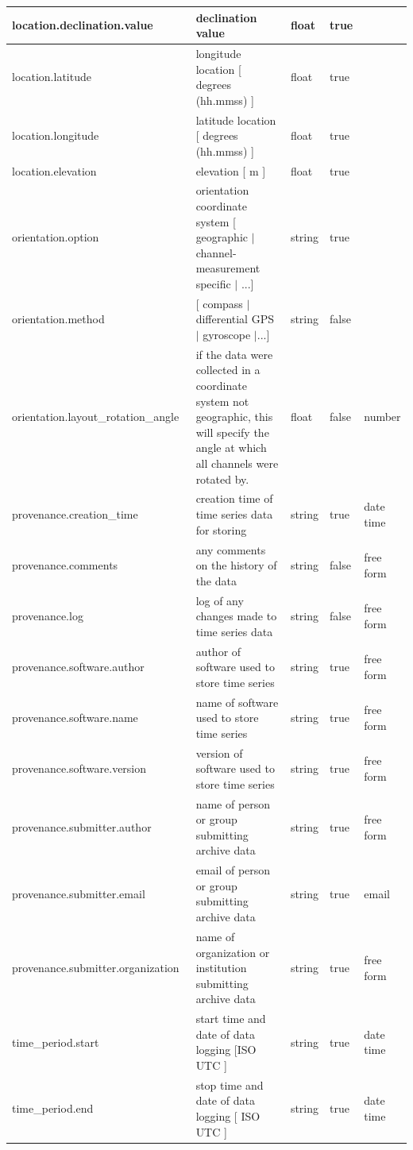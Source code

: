 \documentclass{article}
\begin{document}
\begin{table}[htb!]
\begin{tabular}{|l|p{2.75in}|l|l|p{.95in}|}
        location.declination.value\ & declination value & float & true & \\ \hline
        location.latitude\ & longitude location [ degrees (hh.mmss) ] & float & true & \\ \hline
        location.longitude\ & latitude location [ degrees (hh.mmss) ] & float & true & \\ \hline
        location.elevation\ & elevation [ m ] & float & true & \\ \hline
        orientation.option & orientation coordinate system [ geographic $|$ channel-measurement specific $|$ ...] & string & true & \\ \hline
        orientation.method & [ compass $|$ differential GPS $|$ gyroscope $|$...] & string & false & \\ \hline
        orientation.layout\_rotation\_angle & if the data were collected in a coordinate system not geographic, this will specify the angle at which all channels were rotated by. & float & false & number \\ \hline
        provenance.creation\_time & creation time of time series data for storing & string & true & date time\\ \hline
        provenance.comments\ & any comments on the history of the data & string & false & free form\\ \hline
        provenance.log\ & log of any changes made to time series data & string & false & free form\\ \hline
        provenance.software.author\ & author of software used to store time series & string & true & free form\\ \hline
        provenance.software.name\ & name of software used to store time series & string & true & free form\\ \hline
        provenance.software.version\ & version of software used to store time series & string & true & free form\\ \hline
        provenance.submitter.author\ & name of person or group submitting archive data & string & true & free form\\ \hline
        provenance.submitter.email\ & email of person or group submitting archive data & string & true  & email \\ \hline
        provenance.submitter.organization\ & name of organization or institution submitting archive data & string & true & free form \\ \hline
        time\_period.start\ & start time and date of data logging [ISO UTC ] & string & true & date time\\ \hline
        time\_period.end\ & stop time and date of data logging  [ ISO UTC ] & string & true & date time \\ \hline
    \end{tabular}
\label{tab:station01}
\end{table}    
   
\end{document}

